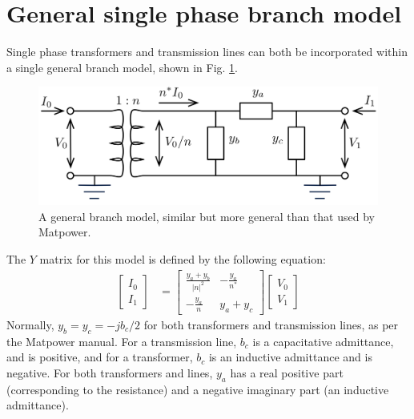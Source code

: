 \documentclass[11pt]{article}
\begin{document}
\section{General single phase branch model}
\label{SEC_GEN_BRANCH_MODEL}
Single phase transformers and transmission lines can both be incorporated within a single general branch model, shown in Fig. \ref{FIG_GEN_BRANCH_MODEL}.
\begin{figure}[!h]
	\begin{center}
		\includegraphics[width=(9cm)]{branch.png}
	\end{center}
	\caption{
		A general branch model, similar but more general than that used by {\sc Matpower}.
	}
	\label{FIG_GEN_BRANCH_MODEL}
\end{figure}
The $Y$ matrix for this model is defined by the following equation:
\begin{align}
	\begin{bmatrix}I_0 \\ I_1\end{bmatrix} &=
	\begin{bmatrix}\frac{y_a + y_b}{|n|^2} & -\frac{y_a}{n^*} \\ -\frac{y_a}{n} & y_a + y_c \end{bmatrix}
	\begin{bmatrix}V_0 \\ V_1\end{bmatrix}
\end{align}
Normally, $y_b = y_c = -jb_c/2$ for both transformers and transmission lines, as per the {\sc Matpower} manual. For a transmission line, $b_c$ is a capacitative admittance, and is positive, and for a transformer, $b_c$ is an inductive admittance and is negative. For both transformers and lines, $y_a$ has a real positive part (corresponding to the resistance) and a negative imaginary part (an inductive admittance).
\end{document}
